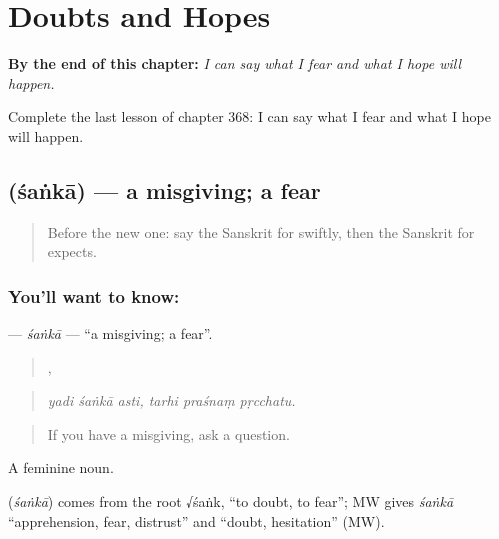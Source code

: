 
\chapter{Doubts and Hopes}
\label{ch:sa-doubts-and-hopes}

\begin{chapteropening}
\textbf{By the end of this chapter:} \emph{I can say what I fear and what I hope will happen.}

Complete the last lesson of chapter 368: I can say what I fear and what I hope will happen.
\end{chapteropening}

\section[\texorpdfstring{\sk{शंका} (śaṅkā)}{शंका (śaṅkā)}]{ (śaṅkā) — a misgiving; a fear}

\label{lesson:SA-C368-sanka}



\begin{quote}
Before the new one: say the Sanskrit for swiftly, then the Sanskrit for expects.
\end{quote}

\subsection*{You'll want to know: }
\textbf{} — \emph{śaṅkā} — \textquotedblleft{}a misgiving; a fear\textquotedblright{}.

\begin{quote}
  ,   
\end{quote}

\begin{quote}
\emph{yadi śaṅkā asti, tarhi praśnaṃ pṛcchatu.}
\end{quote}

\begin{quote}
If you have a misgiving, ask a question.
\end{quote}

A feminine noun.

\begin{cousinweb}
\textbf{} (\emph{śaṅkā}) comes from the root √śaṅk, \textquotedblleft{}to doubt, to fear\textquotedblright{}; MW gives \emph{śaṅkā} \textquotedblleft{}apprehension, fear, distrust\textquotedblright{} and \textquotedblleft{}doubt, hesitation\textquotedblright{} (MW).
\end{cousinweb}


